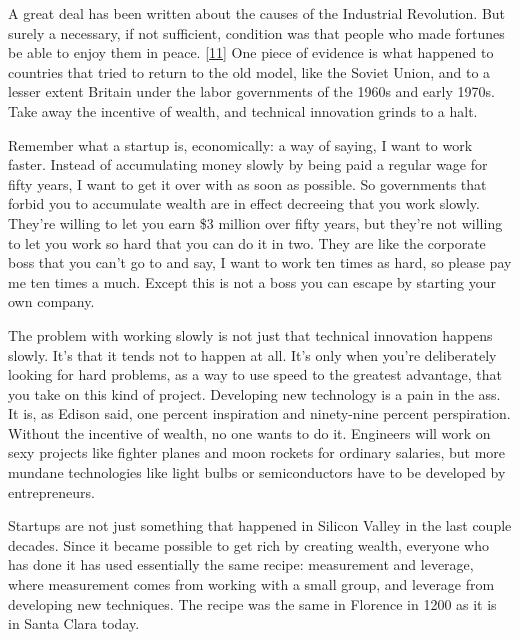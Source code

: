 A great deal has
                    been written about the causes of the Industrial Revolution.
                    But surely a necessary, if not sufficient, condition was
                    that people who made fortunes be able to enjoy them in
                    peace.
                    [\href{\#f11n}{11}]
                    One piece of evidence is what happened to countries that
                    tried to return to the old model, like the Soviet Union, and
                    to a lesser extent Britain under the labor governments of
                    the 1960s and early 1970s. Take away the incentive of
                    wealth, and technical innovation grinds to a halt.

Remember
                    what a startup is, economically: a way of saying, I want to
                    work faster. Instead of accumulating money slowly by being
                    paid a regular wage for fifty years, I want to get it over
                    with as soon as possible. So governments that forbid you to
                    accumulate wealth are in effect decreeing that you work
                    slowly. They're willing to let you earn \$3 million over
                    fifty years, but they're not willing to let you work so hard
                    that you can do it in two. They are like the corporate boss
                    that you can't go to and say, I want to work ten times as
                    hard, so please pay me ten times a much. Except this is not
                    a boss you can escape by starting your own company.

The
                    problem with working slowly is not just that technical
                    innovation happens slowly. It's that it tends not to happen
                    at all. It's only when you're deliberately looking for hard
                    problems, as a way to use speed to the greatest advantage,
                    that you take on this kind of project. Developing new
                    technology is a pain in the ass. It is, as Edison said, one
                    percent inspiration and ninety-nine percent perspiration.
                    Without the incentive of wealth, no one wants to do it.
                    Engineers will work on sexy projects like fighter planes and
                    moon rockets for ordinary salaries, but more mundane
                    technologies like light bulbs or semiconductors have to be
                    developed by entrepreneurs.

Startups are not just
                    something that happened in Silicon Valley in the last couple
                    decades. Since it became possible to get rich by creating
                    wealth, everyone who has done it has used essentially the
                    same recipe: measurement and leverage, where measurement
                    comes from working with a small group, and leverage from
                    developing new techniques. The recipe was the same in
                    Florence in 1200 as it is in Santa Clara today.

